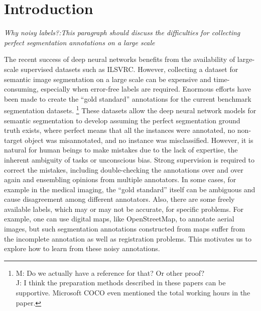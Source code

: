 \section{Introduction}
\label{introduction}

\noindent
\textit{Why noisy labels?:This paragraph should discuss the difficulties for collecting perfect segmentation annotations on a large scale}

\noindent
The recent success of deep neural networks benefits from the availability of large-scale supervised datasets such as ILSVRC\cite{russakovsky2015imagenet}.
However, collecting a dataset for semantic image segmentation on a large scale can be expensive and time-consuming, especially when error-free labels are required.
Enormous efforts have been made to create the ``gold standard'' annotations for the current benchmark segmentation datasets\cite{everingham2015pascal,mottaghi2014role,lin2014microsoft}.
\footnote{M: Do we actually have a reference for that?  Or other proof?\\J: I think the preparation methods described in these papers can be supportive. Microsoft COCO even mentioned the total working hours in the paper.}
These datasets allow the deep neural network models for semantic segmentation \cite{long2015fully,zheng2015conditional} to develop assuming the perfect segmentation ground truth exists, where perfect means that all the instances were annotated, no non-target object was misannotated, and no instance was misclassified.
However, it is natural for human beings to make mistakes due to the lack of expertise, the inherent ambiguity of tasks or unconscious bias.
Strong supervision is required to correct the mistakes, including double-checking the annotations over and over again and ensembling opinions from multiple annotators.
In some cases, for example in the medical imaging, the ``gold standard'' itself can be ambiguous and cause disagreement among different annotators.
Also, there are some freely available labels, which may or may not be accurate, for specific problems.
For example, one can use digital maps, like OpenStreetMap, to annotate aerial images, but such segmentation annotations constructed from maps suffer from the incomplete annotation as well as registration problems.\cite{mnih2012learning}
This motivates us to explore how to learn from these noisy annotations.

